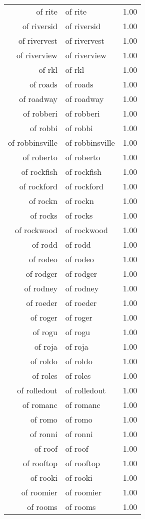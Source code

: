 \begin{table}[ht]
\begin{tabular}{rlr}
  of rite & of rite & 1.00 \\ 
  of riversid & of riversid & 1.00 \\ 
  of rivervest & of rivervest & 1.00 \\ 
  of riverview & of riverview & 1.00 \\ 
  of rkl & of rkl & 1.00 \\ 
  of roads & of roads & 1.00 \\ 
  of roadway & of roadway & 1.00 \\ 
  of robberi & of robberi & 1.00 \\ 
  of robbi & of robbi & 1.00 \\ 
  of robbinsville & of robbinsville & 1.00 \\ 
  of roberto & of roberto & 1.00 \\ 
  of rockfish & of rockfish & 1.00 \\ 
  of rockford & of rockford & 1.00 \\ 
  of rockn & of rockn & 1.00 \\ 
  of rocks & of rocks & 1.00 \\ 
  of rockwood & of rockwood & 1.00 \\ 
  of rodd & of rodd & 1.00 \\ 
  of rodeo & of rodeo & 1.00 \\ 
  of rodger & of rodger & 1.00 \\ 
  of rodney & of rodney & 1.00 \\ 
  of roeder & of roeder & 1.00 \\ 
  of roger & of roger & 1.00 \\ 
  of rogu & of rogu & 1.00 \\ 
  of roja & of roja & 1.00 \\ 
  of roldo & of roldo & 1.00 \\ 
  of roles & of roles & 1.00 \\ 
  of rolledout & of rolledout & 1.00 \\ 
  of romanc & of romanc & 1.00 \\ 
  of romo & of romo & 1.00 \\ 
  of ronni & of ronni & 1.00 \\ 
  of roof & of roof & 1.00 \\ 
  of rooftop & of rooftop & 1.00 \\ 
  of rooki & of rooki & 1.00 \\ 
  of roomier & of roomier & 1.00 \\ 
  of rooms & of rooms & 1.00 \\ 

\end{tabular}
\end{table}
